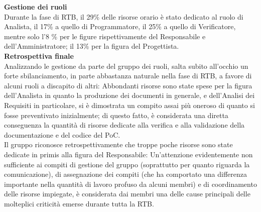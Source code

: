 \textbf{Gestione dei ruoli} \\
Durante la fase di RTB, il 29\% delle risorse orario è stato dedicato al ruolo di Analista, il 17\% a quello di Programmatore, il 25\% a quello di Verificatore, mentre
solo l'8 \% per le figure rispettivamente del Responsabile e dell'Amministratore; il 13\% per la figura del Progettista.\\
\textbf{Retrospettiva finale}\\
Analizzando le gestione da parte del gruppo dei ruoli, salta subito all'occhio un forte sbilanciamento, in parte abbastanza naturale nella fase di RTB, a favore di alcuni ruoli a discapito di altri: Abbondanti risorse sono state spese
per la figura dell'Analista in quanto la produzione dei documenti in generale, e dell'Analisi dei Requisiti in particolare, si è dimostrata un compito assai più oneroso di quanto si fosse preventivato
inizialmente; di questo fatto, è considerata una diretta conseguenza la quantità di risorse dedicate alla verifica e alla validazione della documentazione e del codice del PoC. \\
Il gruppo riconosce retrospettivamente che troppe poche risorse sono state dedicate in primis alla figura del Responsabile: Un'attenzione evidentemente non sufficiente ai compiti di gestione del gruppo (soprattutto per quanto riguarda la comunicazione), di assegnazione
dei compiti (che ha comportato una differenza importante nella quantità di lavoro profuso da alcuni membri) e
di coordinamento delle risorse impiegate, è considerata dai membri una delle cause principali delle molteplici criticità emerse durante tutta la RTB.
